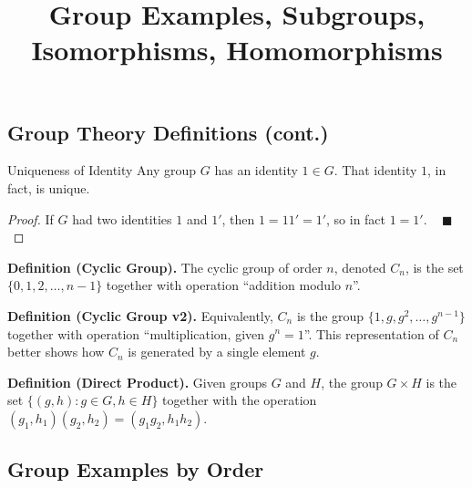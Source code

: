 \title{Group Examples, Subgroups, Isomorphisms, Homomorphisms}



\subsection{Group Theory Definitions (cont.)}

\begin{theorem}{Uniqueness of Identity}
    Any group $G$ has an identity $1 \in G$.  That identity $1$, in fact, is unique.
\end{theorem}

\begin{proof}
    If $G$ had two identities $1$ and $1'$, then $1 = 11' = 1'$, so in fact $1 = 1'$. ~ $\blacksquare$
\end{proof}

\textbf{Definition (Cyclic Group).} The cyclic group of order $n$, denoted $C_n$, is the set $\{0, 1, 2, \dots, n - 1\}$ together with operation ``addition modulo $n$''.

\textbf{Definition (Cyclic Group v2).} Equivalently, $C_n$ is the group $\{1, g, g^2, \dots, g^{n - 1}\}$ together with operation ``multiplication, given $g^n = 1$''.  This representation of $C_n$ better shows how $C_n$ is generated by a single element $g$.

\textbf{Definition (Direct Product).} Given groups $G$ and $H$, the group $G \times H$ is the set $\{(g, h): g \in G, h \in H\}$ together with the operation $(g_1, h_1)(g_2, h_2) = (g_1g_2, h_1h_2)$.

\subsection{Group Examples by Order}

